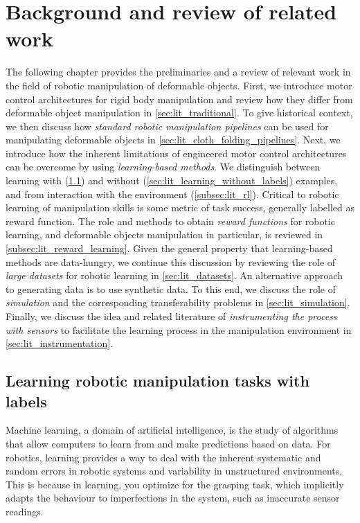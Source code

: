 \documentclass[\home/main.tex]{subfiles}
\begin{document}
\chapter{Background and review of related work} \label{ch:lit}

The following chapter provides the preliminaries and a review of relevant work in the field of robotic manipulation of deformable objects. 
First, we introduce motor control architectures for rigid body manipulation and review how they differ from deformable object manipulation in \cref{sec:lit_traditional}.
To give historical context, we then discuss how \emph{standard robotic manipulation pipelines} can be used for manipulating deformable objects in \cref{sec:lit_cloth_folding_pipelines}.
Next, we introduce how the inherent limitations of engineered motor control architectures can be overcome by using \emph{learning-based methods}. We distinguish between learning with (\cref{sec:lit_sl}) and without (\cref{sec:lit_learning_without_labels}) examples, and from interaction with the environment (\cref{subsec:lit_rl}).
Critical to robotic learning of manipulation skills is some metric of task success, generally labelled as reward function. The role and methods to obtain \emph{reward functions} for robotic learning, and deformable objects manipulation in particular, is reviewed in \cref{subsec:lit_reward_learning}.
Given the general property that learning-based methods are data-hungry, we continue this discussion by reviewing the role of \emph{large datasets} for robotic learning in \cref{sec:lit_datasets}. An alternative approach to generating data is to use synthetic data. To this end, we discuss the role of \emph{simulation} and the corresponding transferability problems in \cref{sec:lit_simulation}. Finally, we discuss the idea and related literature of \emph{instrumenting the process with sensors} to facilitate the learning process in the manipulation environment in \cref{sec:lit_instrumentation}.





\section{Learning robotic manipulation tasks with labels} \label{sec:lit_sl}
Machine learning, a domain of artificial intelligence, is the study of algorithms that allow computers to learn from and make predictions based on data. For robotics, learning provides a way to deal with the inherent systematic and random errors in robotic systems and variability in unstructured environments. This is because in learning, you optimize for the grasping task, which implicitly adapts the behaviour to imperfections in the system, such as inaccurate sensor readings.
\end{document}

